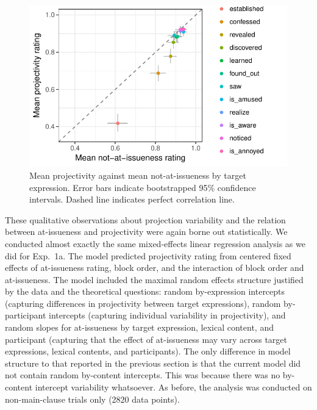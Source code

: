 \documentclass[11pt,fleqn]{article}
\newcommand{\6}{\mbox{$[\hspace*{-.6mm}[$}}
\newcommand{\9}{\mbox{$]\hspace*{-.6mm}]$}}
\begin{document}
\begin{figure}[!h]

\begin{center}
\includegraphics[width=12cm]{../results/exp1b/graphs/ai-proj-bytrigger}
\end{center}

\caption{Mean projectivity against mean not-at-issueness by target expression. Error bars indicate bootstrapped 95\% confidence intervals. Dashed line indicates perfect correlation line.}
\label{fig:f-proj-ai-1b}
\end{figure}

These qualitative observations about projection variability and the relation between at-issueness and projectivity were again borne out statistically. We conducted almost exactly the same mixed-effects linear regression analysis as we did for Exp.~1a. The model predicted projectivity rating from centered fixed effects of at-issueness rating, block order, and the interaction of block order and at-issueness. The model included the maximal random effects structure justified by the data and the theoretical questions: random by-expression intercepts (capturing differences in projectivity between target expressions),  random by-participant intercepts (capturing individual variability in projectivity), and random slopes for at-issueness by target expression, lexical content, and participant (capturing that the effect of at-issueness may vary across target expressions, lexical contents, and participants). The only difference in model structure to that reported in the previous section is that the current model did not contain random by-content intercepts. This was because there was no by-content intercept variability whatsoever. As before, the analysis was conducted on non-main-clause trials only (2820 data points).
\end{document}
